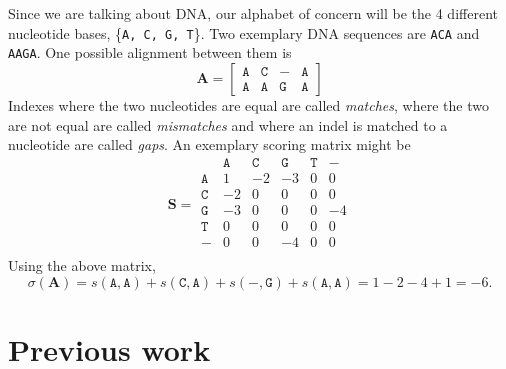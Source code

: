 \documentclass{article}
\begin{document}
\begin{example}
    Since we are talking about DNA, our alphabet of concern will be the 4
    different nucleotide bases, \{\texttt{A, C, G, T}\}. Two exemplary DNA
    sequences are \texttt{ACA} and \texttt{AAGA}. One possible alignment between them is
    \begin{equation*}
        \mathbf A = \begin{bmatrix}
            \mathtt{A} & \mathtt{C} & \mathtt{-} & \mathtt{A} \\
            \mathtt{A} & \mathtt{A} & \mathtt{G} & \mathtt{A}
        \end{bmatrix}
    \end{equation*}
    Indexes where the two nucleotides are equal are called \emph{matches},
    where the two
    are not equal are called \emph{mismatches} and where an indel is matched to
    a nucleotide are called \emph{gaps}. An exemplary scoring matrix might be
    \begin{equation*}
        \mathbf S = \begin{matrix}
             & \mathtt{A} & \mathtt{C} & \mathtt{G} & \mathtt{T} &
            \mathtt{-}                                             \\ \mathtt{A} & 1          & -2         & -3         & 0
             &
            0
            \\ \mathtt{C} & -2         & 0          & 0          & 0
             & 0
            \\ \mathtt{G} & -3         & 0          & 0          & 0
             & -4
            \\ \mathtt{T} & 0          & 0          & 0          & 0
             & 0
            \\ \mathtt{-} & 0          & 0          & -4         & 0
             & 0
            \\
        \end{matrix}
    \end{equation*}
    Using the above matrix, \begin{equation*}
        \sigma(\mathbf A) = s(\mathtt A, \mathtt A) + s(\mathtt C, \mathtt A) + s(\mathtt{-}, \mathtt{G}) + s(\mathtt{A}, \mathtt{A}) = 1 - 2 -4 + 1 = -6.
    \end{equation*}
\end{example}
\section{Previous work}
\end{document}
